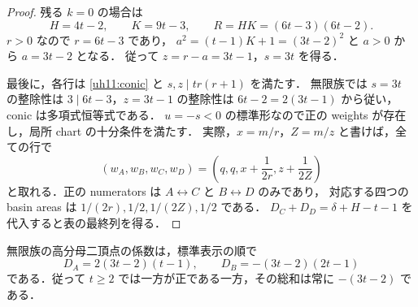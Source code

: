 \begin{proof}
残る $k=0$ の場合は
\[
 H=4t-2,\qquad K=9t-3,\qquad
 R=HK=(6t-3)(6t-2).
\]
$r>0$ なので $r=6t-3$ であり，
$a^2=(t-1)K+1=(3t-2)^2$ と $a>0$ から $a=3t-2$ となる．
従って $z=r-a=3t-1$，$s=3t$ を得る．

最後に，各行は \eqref{uh11:conic} と $s,z\mid tr(r+1)$ を満たす．
無限族では $s=3t$ の整除性は $3\mid6t-3$，$z=3t-1$ の整除性は
$6t-2=2(3t-1)$ から従い，conic は多項式恒等式である．
$u=-s<0$ の標準形なので正の weights が存在し，局所 chart の十分条件を満たす．
実際，$x=m/r$，$Z=m/z$ と書けば，全ての行で
\[
 (w_A,w_B,w_C,w_D)
 =\left(q,q,x+\frac1{2r},z+\frac1{2Z}\right)
\]
と取れる．正の numerators は $A\leftrightarrow C$ と $B\leftrightarrow D$ のみであり，
対応する四つの basin areas は $1/(2r),1/2,1/(2Z),1/2$ である．
$D_C+D_D=\delta+H-t-1$ を代入すると表の最終列を得る．
\end{proof}

無限族の高分母二頂点の係数は，標準表示の順で
\[
 D_A=2(3t-2)(t-1),\qquad
 D_B=-(3t-2)(2t-1)
\]
である．従って $t\geq2$ では一方が正である一方，その総和は常に $-(3t-2)$ である．
